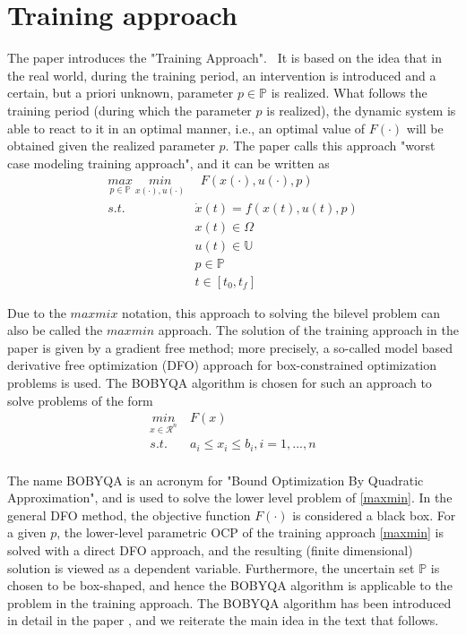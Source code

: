 \documentclass  [
  paper    = a4,
  BCOR     = 10mm,
  twoside,
  fontsize = 12pt,
  fleqn,
  toc      = bibnumbered,
  toc      = listofnumbered,
  numbers  = noendperiod,
  headings = normal,
  listof   = leveldown,
  version  = 3.03
]                                       {scrreprt}
\newcommand{\<}{\langle}
\renewcommand{\>}{\rangle}
\begin{document}
\section{Training approach}
The paper \cite{MatSch22} introduces the "Training Approach".  It is based on the idea that in the real world, during the training period, an intervention is introduced and a certain, but a priori unknown, parameter $p \in \mathbb{P}$ is realized. What follows the training period (during which the parameter $p$ is realized), the dynamic system is able to react to it in an optimal manner, i.e., an optimal value of $ F(\cdot)$ will be obtained given the realized parameter $p$. The paper \cite{MatSch22} calls this approach "worst case modeling training approach", and it can be written as
\begin{equation}
	\begin{aligned}
		\underset{p  \in   \mathbb{P}}{max} \ \underset{x(\cdot), u(\cdot)}{min} &  \ \ F(x(\cdot), u(\cdot), p)\\ 
	s.t.\ \    &  \dot{x} (t) = f(x(t), u(t), p)\\ 
& x(t) \in \Omega \\
&  u(t) \in \mathbb{U}  \\
& p  \in   \mathbb{P}  \\
& t \in [t_0, t_f]
	\end{aligned}
	\label{maxmin}
\end{equation}

Due to the $max mix$ notation, this approach to solving the bilevel problem can also be called the $max min$ approach. The solution of the training approach in the paper \cite{MatSch22} is given by a gradient free method; more precisely, a so-called model based derivative free optimization (DFO) approach for box-constrained optimization problems is used. The BOBYQA algorithm is chosen for such an approach to solve problems of the form
\begin{equation}
	\begin{aligned}
		\underset{x \in \mathcal{R}^n}{min} & \  F(x)  \\ 
		s.t.  & \ a_i \leq x_i \leq b_i, i = 1, ..., n \\
	\end{aligned}
	\label{DFO_bc}
\end{equation}

The name BOBYQA is an acronym for "Bound Optimization By Quadratic Approximation", and is used to solve the lower level problem of \ref{maxmin}. In the general DFO method, the objective function $F(\cdot)$ is considered a black box. For a given $p$, the lower-level parametric OCP of the training approach \ref{maxmin} is solved with a direct DFO approach, and the resulting (finite dimensional) solution is viewed as a dependent variable. Furthermore, the uncertain set $\mathbb{P}$ is chosen to be box-shaped, and hence the BOBYQA algorithm is applicable to the problem in the training approach. The BOBYQA algorithm has been introduced in detail in the paper \cite{MicPow09}, and we reiterate the main idea in the text that follows.
\end{document}
